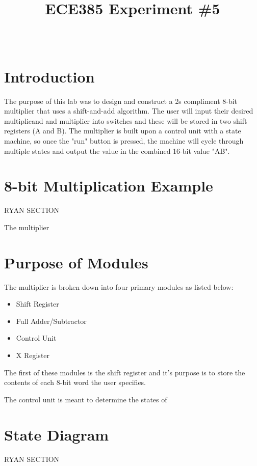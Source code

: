 \documentclass[journal, twocolumn, final,11pt,letterpaper]{IEEEtran}
\title{ECE385 Experiment \#5
	}
\author{
\IEEEauthorblockN{Eric Meyers, Ryan Helsdingen}\\
\IEEEauthorblockA{Section ABG; TAs: Ben Delay, Shuo Liu \\
February 24th, 2016 \\
emeyer7, helsdin2}}
\begin{document}
	
\maketitle
\singlespacing

\section{Introduction}
The purpose of this lab was to design and construct a 2s compliment 8-bit multiplier that uses a shift-and-add algorithm. The user will input their desired multiplicand and multiplier into switches and these will be stored in two shift registers (A and B). The multiplier is built upon a control unit with a state machine, so once the "run" button is pressed, the machine will cycle through multiple states and output the value in the combined 16-bit value "AB".

\section{8-bit Multiplication Example}
RYAN SECTION

The multiplier

\section{Purpose of Modules}
The multiplier is broken down into four primary modules as listed below:
\begin{itemize}
	\item Shift Register 
	\item Full Adder/Subtractor
	\item Control Unit 
	\item X Register 
\end{itemize}
The first of these modules is the shift register and it's purpose is to store the contents of each 8-bit word the user specifies.

The control unit is meant to determine the states of 

\section{State Diagram}
RYAN SECTION

\end{document}
